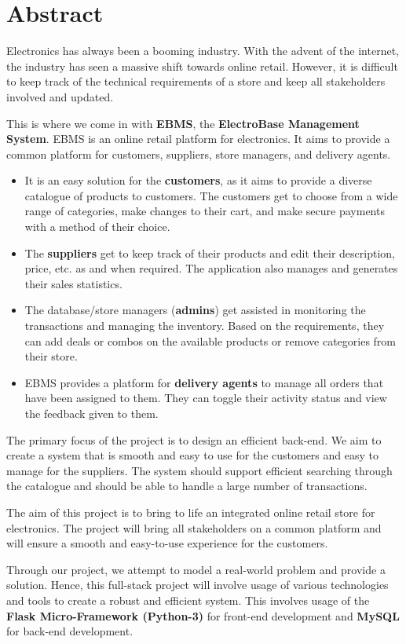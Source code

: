 \section{Abstract}

Electronics has always been a booming industry.
With the advent of the internet, the industry has seen a massive shift towards online retail.
However, it is difficult to keep track of the technical requirements of a store and keep all stakeholders involved and updated.

This is where we come in with \textbf{EBMS}, the \textbf{ElectroBase Management System}.
EBMS is an online retail platform for electronics.
It aims to provide a common platform for customers, suppliers, store managers, and delivery agents.
\begin{itemize}
    \item
    It is an easy solution for the \textbf{customers}, as it aims to provide a diverse catalogue of products to customers.
    The customers get to choose from a wide range of categories, make changes to their cart, and make secure payments with a method of their choice.
    \item
    The \textbf{suppliers} get to keep track of their products and edit their description, price, etc. as and when required.
    The application also manages and generates their sales statistics.
    \item
    The database/store managers (\textbf{admins}) get assisted in monitoring the transactions and managing the inventory.
    Based on the requirements, they can add deals or combos on the available products or remove categories from their store.
    \item
    EBMS provides a platform for \textbf{delivery agents} to manage all orders that have been assigned to them.
    They can toggle their activity status and view the feedback given to them.
\end{itemize}

The primary focus of the project is to design an efficient back-end.
We aim to create a system that is smooth and easy to use for the customers and easy to manage for the suppliers.
The system should support efficient searching through the catalogue and should be able to handle a large number of transactions.

\divider

The aim of this project is to bring to life an integrated online retail store for electronics.
The project will bring all stakeholders on a common platform and will ensure a smooth
and easy-to-use experience for the customers.

Through our project, we attempt to model a real-world problem and provide a solution.
Hence, this full-stack project will involve usage of various technologies and tools to create a robust and efficient system.
This involves usage of the \textbf{Flask Micro-Framework (Python-3)} for front-end development and \textbf{MySQL} for back-end development.